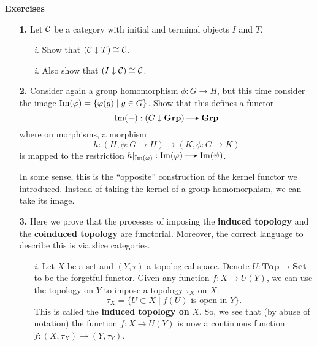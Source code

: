         {\large \textbf{Exercises}
        \vspace{0.5cm}}
        \begin{itemize}
            \item[\textbf{1.}]
            Let $\mathcal{C}$ be a category with initial and terminal objects $I$ and $T$. 
            \begin{itemize}
                \item[\emph{i}.]
                Show that $(\mathcal{C} \downarrow T) \cong \mathcal{C}$.
                \item[\emph{i}.]
                Also show that $(I \downarrow \mathcal{C}) \cong \mathcal{C}$. 
            \end{itemize} 

            \item[\textbf{2.}]
            Consider again a group homomorphism $\phi: G \to H$, but this time 
            consider the image $\operatorname{\rm{Im}}(\varphi) = \{\varphi(g) \mid g \in G\}$. 
            Show that this defines a functor 
            \[
                \im(-): (G \downarrow \textbf{Grp}) \to \textbf{Grp}
            \] 
            where on morphisms, a morphism 
            \[
                h: (H, \phi: G \to H) \to (K, \phi: G \to K)                
            \]
            is mapped to the restriction 
            $h|_{\text{Im}(\phi)}: \im(\phi) \to \im(\psi)$. 
        
            In some sense, this is the ``opposite'' construction of the 
            kernel functor we introduced. Instead of taking the kernel of a group homomorphism, 
            we can take its image.

            \item[\textbf{3.}]
            Here we prove that the processes of imposing the \textbf{induced topology} 
            and the \textbf{coinduced topology} are functorial. Moreover, the correct language 
            to describe this is via slice categories. 
            \begin{itemize}
                \item[\emph{i}.]
                Let $X$ be a set and $(Y, \tau)$ a topological space. 
                Denote $U: \textbf{Top} \to \textbf{Set}$ 
                to be the forgetful functor. Given any function $f: X \to U(Y)$,
                we can use the topology on $Y$ to impose a topology $\tau_X$ on $X$:
                \[
                    \tau_X = \{U \subset X \mid f(U) \text{ is open in }Y\}.
                \]
                This is called the \textbf{induced topology on} $X$.  
                So, we see that (by abuse of notation) the function $f: X \to U(Y)$ 
                is now a continuous function $f: (X, \tau_X) \to (Y, \tau_Y)$. 
    

\end{itemize}
\end{itemize}
